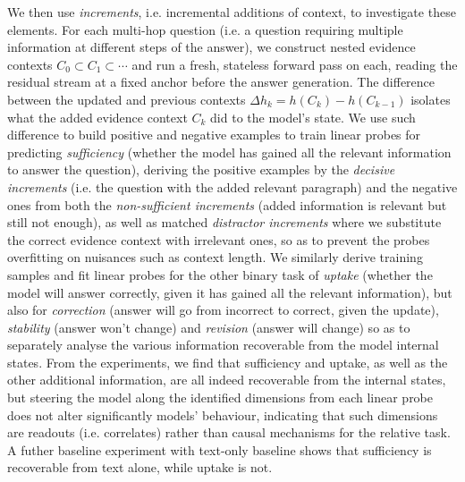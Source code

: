 We then use \emph{increments}, i.e. incremental additions of context, to investigate these elements. For each multi-hop question (i.e. a question requiring multiple information at different steps of the answer), we construct nested evidence contexts $C_0\subset C_1\subset\cdots$ and run a fresh, stateless forward pass on each, reading the residual stream at a fixed anchor before the answer generation. The difference between the updated and previous contexts $\Delta h_{k}=h(C_k)-h(C_{k-1})$ isolates what the added evidence context $C_k$ did to the model's state. 
We use such difference to build positive and negative examples to train linear probes for predicting \emph{sufficiency} (whether the model has gained all the relevant information to answer the question), deriving the positive examples by the \emph{decisive increments} (i.e. the question with the added relevant paragraph) and the negative ones from both the \emph{non-sufficient increments} (added information is relevant but still not enough), as well as matched \emph{distractor increments} where we substitute the correct evidence context with irrelevant ones, so as to prevent the probes overfitting on nuisances such as context length. We similarly derive training samples and fit linear probes for the other binary task of \emph{uptake} (whether the model will answer correctly, given it has gained all the relevant information), but also for \emph{correction} (answer will go from incorrect to correct, given the update), \emph{stability} (answer won't change) and \emph{revision} (answer will change) so as to separately analyse the various information recoverable from the model internal states. From the experiments, we find that sufficiency and uptake, as well as the other additional information, are all indeed recoverable from the internal states, but steering the model along the identified dimensions from each linear probe does not alter significantly models' behaviour, indicating that such dimensions are readouts (i.e. correlates) rather than causal mechanisms for the relative task. A futher baseline experiment with text-only baseline shows that sufficiency is recoverable from text alone, while uptake is not.
